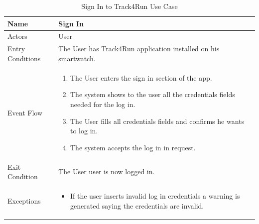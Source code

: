 \begin{enumerate}
\FloatBarrier
\begin{table}[h]
\begin{tabular}{|p{3.4cm}|p{}|}
\hline
Name             & Sign In \\ \hline
Actors           & User  \\ \hline
Entry Conditions & The User has Track4Run application installed on his smartwatch.    \\ \hline
Event Flow       & \begin{enumerate}
			\item The User enters the sign in section of the app.
            \item The system shows to the user all the credentials fields needed for the log in.
            \item The User fills all credentials fields and confirms he wants to log in.
            \item The system accepts the log in in request.
        \end{enumerate}\\ \hline
Exit Condition   & The User user is now logged in.\\ \hline
Exceptions       & \begin{itemize}
\item If the user inserts invalid log in credentials a warning is generated saying the credentials are invalid.
\end{itemize}\\ \hline
\end{tabular}
\caption{Sign In to Track4Run Use Case}
\end{table}
\FloatBarrier


\end{enumerate}
